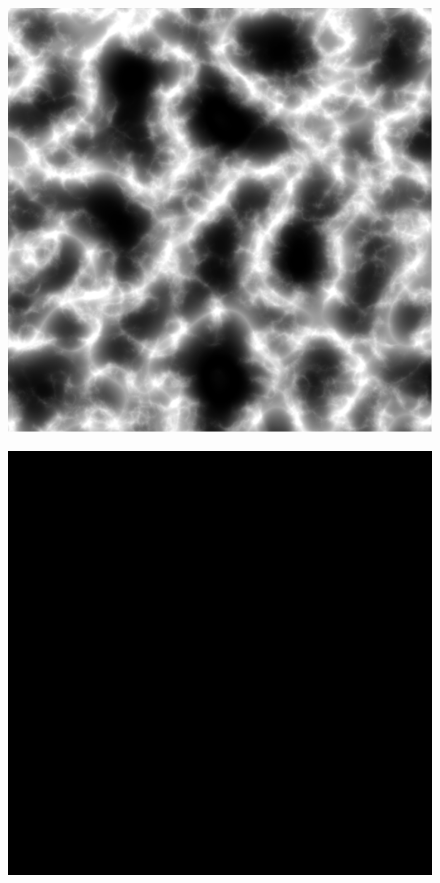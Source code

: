 \begin{figure}[H]
	\begin{minipage}[b]{.32\linewidth}
		\includegraphics[width=0.95\linewidth]{img/Ridged}
		\label{fig:6a}
	\end{minipage}
	\begin{minipage}[b]{.32\linewidth}
		\includegraphics[width=0.95\linewidth]{img/BlackMask}

\end{minipage}
\end{figure}
